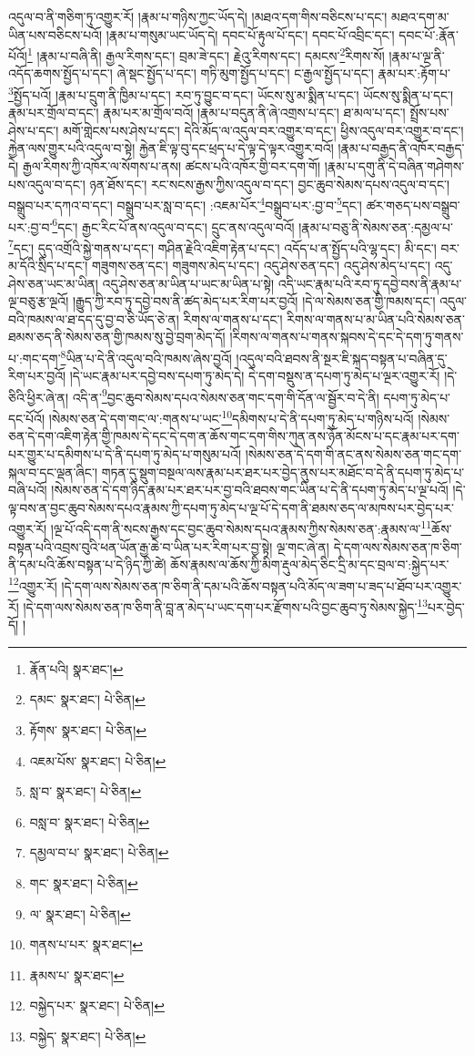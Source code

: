 འདུལ་བ་ནི་གཅིག་ཏུ་འགྱུར་རོ། །རྣམ་པ་གཉིས་ཀྱང་ཡོད་དེ། །མཐའ་དག་གིས་བཅིངས་པ་དང་། མཐའ་དག་མ་ཡིན་པས་བཅིངས་པའོ། །རྣམ་པ་གསུམ་ཡང་ཡོད་དེ། དབང་པོ་རྟུལ་པོ་དང་། དབང་པོ་འབྲིང་དང་། དབང་པོ་:རྣོན་པོའོ།\footnote{རྣོན་པའི།  སྣར་ཐང་། } །རྣམ་པ་བཞི་ནི། རྒྱལ་རིགས་དང་། བྲམ་ཟེ་དང་། རྗེའུ་རིགས་དང་། དམངས་\footnote{དམང་  སྣར་ཐང་།  པེ་ཅིན། }རིགས་སོ། །རྣམ་པ་ལྔ་ནི་འདོད་ཆགས་སྤྱོད་པ་དང་། ཞེ་སྡང་སྤྱོད་པ་དང་། གཏི་མུག་སྤྱོད་པ་དང་། ང་རྒྱལ་སྤྱོད་པ་དང་། རྣམ་པར་:རྟོག་པ་\footnote{རྟོགས་  སྣར་ཐང་།  པེ་ཅིན། }སྤྱོད་པའོ། །རྣམ་པ་དྲུག་ནི་ཁྱིམ་པ་དང་། རབ་ཏུ་བྱུང་བ་དང་། ཡོངས་སུ་མ་སྨིན་པ་དང་། ཡོངས་སུ་སྨིན་པ་དང་། རྣམ་པར་གྲོལ་བ་དང་། རྣམ་པར་མ་གྲོལ་བའོ། །རྣམ་པ་བདུན་ནི་ཞེ་འགྲས་པ་དང་། ཐ་མལ་པ་དང་། སྤྲོས་པས་ཤེས་པ་དང་། མགོ་གླེངས་པས་ཤེས་པ་དང་། དེའི་མོད་ལ་འདུལ་བར་འགྱུར་བ་དང་། ཕྱིས་འདུལ་བར་འགྱུར་བ་དང་། རྐྱེན་ལས་གྱུར་པའི་འདུལ་བ་སྟེ། རྐྱེན་ཇི་ལྟ་བུ་དང་ཕྲད་པ་དེ་ལྟ་དེ་ལྟར་འགྱུར་བའོ། །རྣམ་པ་བརྒྱད་ནི་འཁོར་བརྒྱད་དེ། རྒྱལ་རིགས་ཀྱི་འཁོར་ལ་སོགས་པ་ནས། ཚངས་པའི་འཁོར་གྱི་བར་དག་གོ། །རྣམ་པ་དགུ་ནི་དེ་བཞིན་གཤེགས་པས་འདུལ་བ་དང་། ཉན་ཐོས་དང་། རང་སངས་རྒྱས་ཀྱིས་འདུལ་བ་དང་། བྱང་ཆུབ་སེམས་དཔས་འདུལ་བ་དང་། བསྒྲུབ་པར་དཀའ་བ་དང་། བསྒྲུབ་པར་སླ་བ་དང་། :འཇམ་པོར་\footnote{འཇམ་པོས་  སྣར་ཐང་།  པེ་ཅིན། }བསྒྲུབ་པར་:བྱ་བ་\footnote{སླ་བ་  སྣར་ཐང་།  པེ་ཅིན། }དང་། ཚར་གཅད་པས་བསྒྲུབ་པར་:བྱ་བ་\footnote{བསླ་བ་  སྣར་ཐང་།  པེ་ཅིན། }དང་། རྒྱང་རིང་པོ་ནས་འདུལ་བ་དང་། དྲུང་ནས་འདུལ་བའོ། །རྣམ་པ་བཅུ་ནི་སེམས་ཅན་:དམྱལ་པ་\footnote{དམྱལ་བ་པ་  སྣར་ཐང་།  པེ་ཅིན། }དང་། དུད་འགྲོའི་སྐྱེ་གནས་པ་དང་། གཤིན་རྗེའི་འཇིག་རྟེན་པ་དང་། འདོད་པ་ན་སྤྱོད་པའི་ལྷ་དང་། མི་དང་། བར་མ་དོའི་སྲིད་པ་དང་། གཟུགས་ཅན་དང་། གཟུགས་མེད་པ་དང་། འདུ་ཤེས་ཅན་དང་། འདུ་ཤེས་མེད་པ་དང་། འདུ་ཤེས་ཅན་ཡང་མ་ཡིན། འདུ་ཤེས་ཅན་མ་ཡིན་པ་ཡང་མ་ཡིན་པ་སྟེ། འདི་ཡང་རྣམ་པའི་རབ་ཏུ་དབྱེ་བས་ནི་རྣམ་པ་ལྔ་བཅུ་རྩ་ལྔའོ། །རྒྱུད་ཀྱི་རབ་ཏུ་དབྱེ་བས་ནི་ཚད་མེད་པར་རིག་པར་བྱའོ། །དེ་ལ་སེམས་ཅན་གྱི་ཁམས་དང་། འདུལ་བའི་ཁམས་ལ་ཐ་དད་དུ་བྱ་བ་ཅི་ཡོད་ཅེ་ན། རིགས་ལ་གནས་པ་དང་། རིགས་ལ་གནས་པ་མ་ཡིན་པའི་སེམས་ཅན་ཐམས་ཅད་ནི་སེམས་ཅན་གྱི་ཁམས་སུ་བྱེ་བྲག་མེད་དོ། །རིགས་ལ་གནས་པ་གནས་སྐབས་དེ་དང་དེ་དག་ཏུ་གནས་པ་:གང་དག་\footnote{གང་  སྣར་ཐང་།  པེ་ཅིན། }ཡིན་པ་དེ་ནི་འདུལ་བའི་ཁམས་ཞེས་བྱའོ། །འདུལ་བའི་ཐབས་ནི་སྔར་ཇི་སྐད་བསྟན་པ་བཞིན་དུ་རིག་པར་བྱའོ། །དེ་ཡང་རྣམ་པར་དབྱེ་བས་དཔག་ཏུ་མེད་དེ། དེ་དག་བསྡུས་ན་དཔག་ཏུ་མེད་པ་ལྔར་འགྱུར་རོ། །དེ་ཅིའི་ཕྱིར་ཞེ་ན། འདི་ན་\footnote{ལ་  སྣར་ཐང་།  པེ་ཅིན། }བྱང་ཆུབ་སེམས་དཔའ་སེམས་ཅན་གང་དག་གི་དོན་ལ་སྦྱོར་བ་དེ་ནི། དཔག་ཏུ་མེད་པ་དང་པོའོ། །སེམས་ཅན་དེ་དག་གང་ལ་:གནས་པ་ཡང་\footnote{གནས་པ་པར་  སྣར་ཐང་། }དམིགས་པ་དེ་ནི་དཔག་ཏུ་མེད་པ་གཉིས་པའོ། །སེམས་ཅན་དེ་དག་འཇིག་རྟེན་གྱི་ཁམས་དེ་དང་དེ་དག་ན་ཆོས་གང་དག་གིས་ཀུན་ནས་ཉོན་མོངས་པ་དང་རྣམ་པར་དག་པར་གྱུར་པ་དམིགས་པ་དེ་ནི་དཔག་ཏུ་མེད་པ་གསུམ་པའོ། །སེམས་ཅན་དེ་དག་གི་ནང་ནས་སེམས་ཅན་གང་དག་སྐལ་བ་དང་ལྡན་ཞིང་། གཏན་དུ་སྡུག་བསྔལ་ལས་རྣམ་པར་ཐར་པར་བྱེད་ནུས་པར་མཐོང་བ་དེ་ནི་དཔག་ཏུ་མེད་པ་བཞི་པའོ། །སེམས་ཅན་དེ་དག་ཉིད་རྣམ་པར་ཐར་པར་བྱ་བའི་ཐབས་གང་ཡིན་པ་དེ་ནི་དཔག་ཏུ་མེད་པ་ལྔ་པའོ། །དེ་ལྟ་བས་ན་བྱང་ཆུབ་སེམས་དཔའ་རྣམས་ཀྱི་དཔག་ཏུ་མེད་པ་ལྔ་པོ་དེ་དག་ནི་ཐམས་ཅད་ལ་མཁས་པར་བྱེད་པར་འགྱུར་རོ། །ལྔ་པོ་འདི་དག་ནི་སངས་རྒྱས་དང་བྱང་ཆུབ་སེམས་དཔའ་རྣམས་ཀྱིས་སེམས་ཅན་:རྣམས་ལ་\footnote{རྣམས་པ་  སྣར་ཐང་། }ཆོས་བསྟན་པའི་འབྲས་བུའི་ཕན་ཡོན་རྒྱ་ཆེ་བ་ཡིན་པར་རིག་པར་བྱ་སྟེ། ལྔ་གང་ཞེ་ན། དེ་དག་ལས་སེམས་ཅན་ཁ་ཅིག་ནི་དམ་པའི་ཆོས་བསྟན་པ་དེ་ཉིད་ཀྱི་ཚེ། ཆོས་རྣམས་ལ་ཆོས་ཀྱི་མིག་རྡུལ་མེད་ཅིང་དྲི་མ་དང་བྲལ་བ་:སྐྱེད་པར་\footnote{བསྐྱེད་པར་  སྣར་ཐང་།  པེ་ཅིན། }འགྱུར་རོ། །དེ་དག་ལས་སེམས་ཅན་ཁ་ཅིག་ནི་དམ་པའི་ཆོས་བསྟན་པའི་མོད་ལ་ཟག་པ་ཟད་པ་ཐོབ་པར་འགྱུར་རོ། །དེ་དག་ལས་སེམས་ཅན་ཁ་ཅིག་ནི་བླ་ན་མེད་པ་ཡང་དག་པར་རྫོགས་པའི་བྱང་ཆུབ་ཏུ་སེམས་སྐྱེད་\footnote{བསྐྱེད་  སྣར་ཐང་།  པེ་ཅིན། }པར་བྱེད་དོ། །
